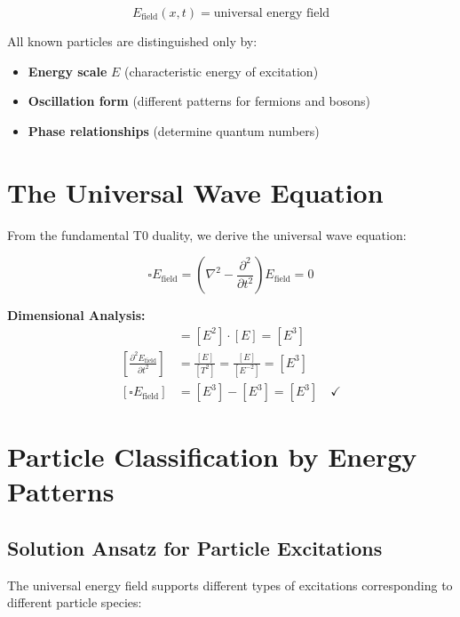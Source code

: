 \documentclass[12pt,a4paper]{report}
\begin{document}
	\begin{equation}
		\boxed{E_{\text{field}}(x,t) = \text{universal energy field}}
		\label{eq:universal_energy_field}
	\end{equation}
	
	All known particles are distinguished only by:
	\begin{itemize}
		\item \textbf{Energy scale} $E$ (characteristic energy of excitation)
		\item \textbf{Oscillation form} (different patterns for fermions and bosons)
		\item \textbf{Phase relationships} (determine quantum numbers)
	\end{itemize}
	
	\section{The Universal Wave Equation}
	\label{sec:universal_wave_equation}
	
	From the fundamental T0 duality, we derive the universal wave equation:
	
	\begin{equation}
		\boxed{\square E_{\text{field}} = \left(\nabla^2 - \frac{\partial^2}{\partial t^2}\right) E_{\text{field}} = 0}
		\label{eq:universal_wave_equation}
	\end{equation}
	
	\textbf{Dimensional Analysis:}
	\begin{align}
		[\nabla^2 E_{\text{field}}] &= [E^2] \cdot [E] = [E^3] \\
		\left[\frac{\partial^2 E_{\text{field}}}{\partial t^2}\right] &= \frac{[E]}{[T^2]} = \frac{[E]}{[E^{-2}]} = [E^3] \\
		[\square E_{\text{field}}] &= [E^3] - [E^3] = [E^3] \quad \checkmark
	\end{align}
	
	\section{Particle Classification by Energy Patterns}
	\label{sec:particle_classification}
	
	\subsection{Solution Ansatz for Particle Excitations}
	\label{subsec:solution_ansatz}
	
	The universal energy field supports different types of excitations corresponding to different particle species:
	
\end{document}
